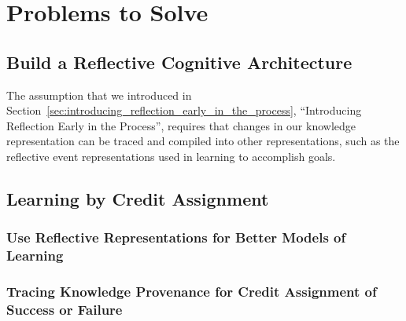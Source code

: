 \chapter{Problems to Solve}\label{ch:problems_to_solve}

\section{Build a Reflective Cognitive Architecture}

The assumption that we introduced in
Section~\ref{sec:introducing_reflection_early_in_the_process},
``Introducing Reflection Early in the Process'', requires that changes
in our knowledge representation can be traced and compiled into other
representations, such as the reflective event representations used in
learning to accomplish goals.


\section{Learning by Credit Assignment}

\subsection{Use Reflective Representations for Better Models of Learning}

\subsection{Tracing Knowledge Provenance for Credit Assignment of Success or Failure}



